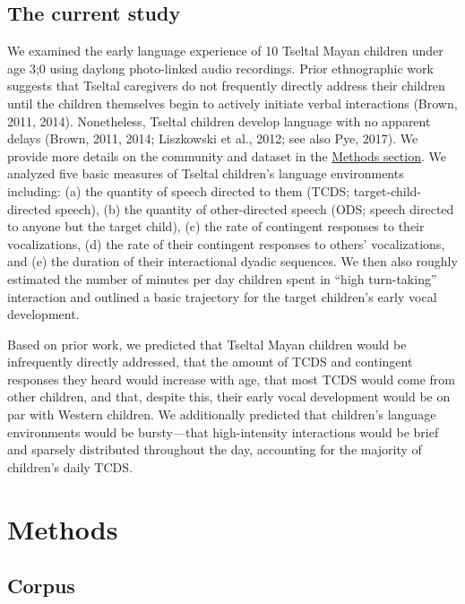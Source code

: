 \documentclass[floatsintext,man]{apa6}
\theoremstyle{definition}
\theoremstyle{definition}
\theoremstyle{definition}
\theoremstyle{remark}
\begin{document}
\subsection{The current study}\label{intro-currentstudy}

We examined the early language experience of 10 Tseltal Mayan children
under age 3;0 using daylong photo-linked audio recordings. Prior
ethnographic work suggests that Tseltal caregivers do not frequently
directly address their children until the children themselves begin to
actively initiate verbal interactions (Brown, 2011, 2014). Nonetheless,
Tseltal children develop language with no apparent delays (Brown, 2011,
2014; Liszkowski et al., 2012; see also Pye, 2017). We provide more
details on the community and dataset in the
\protect\hyperlink{methods}{Methods section}. We analyzed five basic
measures of Tseltal children's language environments including: (a) the
quantity of speech directed to them (TCDS; target-child-directed
speech), (b) the quantity of other-directed speech (ODS; speech directed
to anyone but the target child), (c) the rate of contingent responses to
their vocalizations, (d) the rate of their contingent responses to
others' vocalizations, and (e) the duration of their interactional
dyadic sequences. We then also roughly estimated the number of minutes
per day children spent in \enquote{high turn-taking} interaction and
outlined a basic trajectory for the target children's early vocal
development.

Based on prior work, we predicted that Tseltal Mayan children would be
infrequently directly addressed, that the amount of TCDS and contingent
responses they heard would increase with age, that most TCDS would come
from other children, and that, despite this, their early vocal
development would be on par with Western children. We additionally
predicted that children's language environments would be bursty---that
high-intensity interactions would be brief and sparsely distributed
throughout the day, accounting for the majority of children's daily
TCDS.

\hypertarget{methods}{\section{Methods}\label{methods}}

\subsection{Corpus}\label{methods-dataset}
\end{document}
